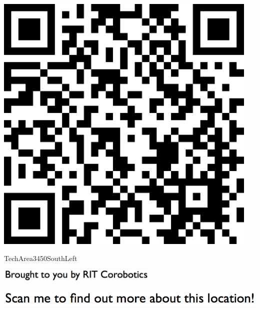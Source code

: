 \documentclass[letterpaper]{article}
\begin{document}
 \begingroup 
 \centerline{\includegraphics[scale=1,width=5in,height=5in]{TechArea3450SouthLeft.png}} 
 \endgroup 
 \vspace*{\fill} 

 \hfill{\small TechArea3450SouthLeft} 

  \vspace{0.7in} 
 
 \centerline{\includegraphics[scale=1,width=3in]{text-bottom.png}} 
 
 \pagebreak 
{} 
 \vspace*{\fill} 
 
  \centerline{\includegraphics[scale=1,width=6in]{text-top.png}} 
 
 \vspace{0.5in} 
 
\end{document}
